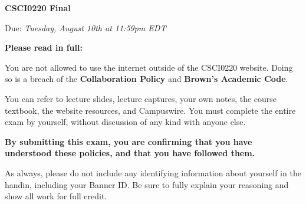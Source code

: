 \documentclass[12pt,letterpaper]{article}
\begin{document}
  \thispagestyle{firstpagestyle}
  \begin{center}
    {\huge \textbf{CSCI0220 Final}}

    {\large Due: \textit{Tuesday, August 10th at 11:59pm EDT}}
  \end{center}
  
 {\large \textbf{Please read in full:}}
 
You are not allowed to use the internet outside of the CSCI0220 website. Doing so is a breach of the \textbf{Collaboration Policy} and \textbf{Brown's Academic Code}.

You can refer to lecture slides, lecture captures, your own notes, the course textbook, the website resources, and Campuswire. You must complete the entire exam by yourself, without discussion of any kind with anyone else.

\textbf{By submitting this exam, you are confirming that you have understood these policies, and that you have followed them.}

As always, please do not include any identifying information about yourself in the handin, including your Banner ID. Be sure to fully explain your reasoning and show all work for full credit.
\end{document}
